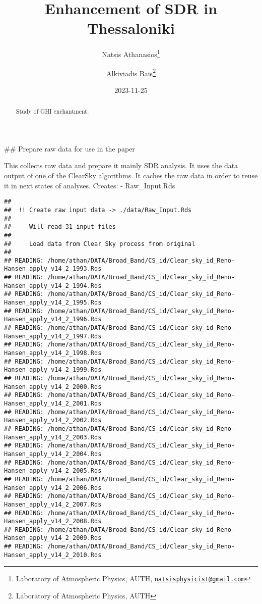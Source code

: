 \documentclass[
  10pt,
  a4paper,oneside]{article}
\title{Enhancement of SDR in Thessaloniki}
\author{Natsis Athanasios\footnote{Laboratory of Atmospheric Physics, AUTH, \href{mailto:natsisphysicist@gmail.com}{\nolinkurl{natsisphysicist@gmail.com}}} \and Alkiviadis Bais\footnote{Laboratory of Atmospheric Physics, AUTH}}
\date{2023-11-25}
\begin{document}
\maketitle
\begin{abstract}
Study of GHI enchantment.
\end{abstract}

{
\hypersetup{linkcolor=}
\setcounter{tocdepth}{4}
\tableofcontents
}
\#\# Prepare raw data for use in the paper

This collects raw data and prepare it mainly SDR analysis.
It uses the data output of one of the ClearSky algorithms.
It caches the raw data in order to reuse it in next states of analyses.
Creates:
- Raw\_Input.Rds

\begin{verbatim}
## 
##  !! Create raw input data -> ./data/Raw_Input.Rds 
## 
##     Will read 31 input files
## 
##     Load data from Clear Sky process from original
## 
## READING: /home/athan/DATA/Broad_Band/CS_id/Clear_sky_id_Reno-Hansen_apply_v14_2_1993.Rds 
## READING: /home/athan/DATA/Broad_Band/CS_id/Clear_sky_id_Reno-Hansen_apply_v14_2_1994.Rds 
## READING: /home/athan/DATA/Broad_Band/CS_id/Clear_sky_id_Reno-Hansen_apply_v14_2_1995.Rds 
## READING: /home/athan/DATA/Broad_Band/CS_id/Clear_sky_id_Reno-Hansen_apply_v14_2_1996.Rds 
## READING: /home/athan/DATA/Broad_Band/CS_id/Clear_sky_id_Reno-Hansen_apply_v14_2_1997.Rds 
## READING: /home/athan/DATA/Broad_Band/CS_id/Clear_sky_id_Reno-Hansen_apply_v14_2_1998.Rds 
## READING: /home/athan/DATA/Broad_Band/CS_id/Clear_sky_id_Reno-Hansen_apply_v14_2_1999.Rds 
## READING: /home/athan/DATA/Broad_Band/CS_id/Clear_sky_id_Reno-Hansen_apply_v14_2_2000.Rds 
## READING: /home/athan/DATA/Broad_Band/CS_id/Clear_sky_id_Reno-Hansen_apply_v14_2_2001.Rds 
## READING: /home/athan/DATA/Broad_Band/CS_id/Clear_sky_id_Reno-Hansen_apply_v14_2_2002.Rds 
## READING: /home/athan/DATA/Broad_Band/CS_id/Clear_sky_id_Reno-Hansen_apply_v14_2_2003.Rds 
## READING: /home/athan/DATA/Broad_Band/CS_id/Clear_sky_id_Reno-Hansen_apply_v14_2_2004.Rds 
## READING: /home/athan/DATA/Broad_Band/CS_id/Clear_sky_id_Reno-Hansen_apply_v14_2_2005.Rds 
## READING: /home/athan/DATA/Broad_Band/CS_id/Clear_sky_id_Reno-Hansen_apply_v14_2_2006.Rds 
## READING: /home/athan/DATA/Broad_Band/CS_id/Clear_sky_id_Reno-Hansen_apply_v14_2_2007.Rds 
## READING: /home/athan/DATA/Broad_Band/CS_id/Clear_sky_id_Reno-Hansen_apply_v14_2_2008.Rds 
## READING: /home/athan/DATA/Broad_Band/CS_id/Clear_sky_id_Reno-Hansen_apply_v14_2_2009.Rds 
## READING: /home/athan/DATA/Broad_Band/CS_id/Clear_sky_id_Reno-Hansen_apply_v14_2_2010.Rds 

\end{verbatim}
\end{document}
